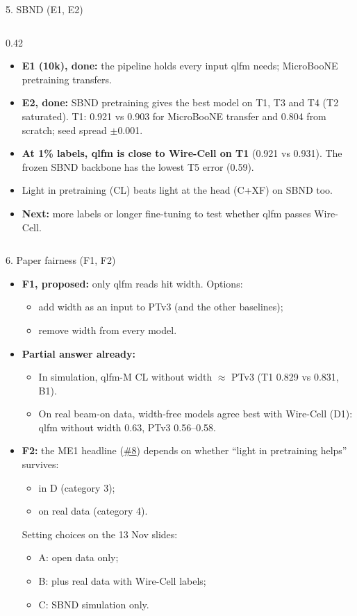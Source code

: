 \documentclass[aspectratio=169,10pt]{beamer}
\newcommand{\gh}{https://github.com/HaiwangYu/fm4npp-lartpc}
\newcommand{\iss}[1]{\href{\gh/issues/#1}{\color{blue!60!black}\##1}}
\begin{document}
\begin{frame}{5. SBND (E1, E2)}
\begin{columns}[T]
\begin{column}{0.42\textwidth}
\begin{itemize}
        \item \textbf{E1 (10k), done:} the pipeline holds every input qlfm needs; MicroBooNE pretraining transfers.
        \item \textbf{E2, done:} SBND pretraining gives the best model on T1, T3 and T4 (T2 saturated). T1: 0.921 vs 0.903 for MicroBooNE transfer and 0.804 from scratch; seed spread $\pm$0.001.
        \item \textbf{At 1\% labels, qlfm is close to Wire-Cell on T1} (0.921 vs 0.931). The frozen SBND backbone has the lowest T5 error (0.59).
        \item Light in pretraining (CL) beats light at the head (C+XF) on SBND too.
        \item \textbf{Next:} more labels or longer fine-tuning to test whether qlfm passes Wire-Cell.
      \end{itemize}
    \end{column}
  \end{columns}
\end{frame}

\begin{frame}{6. Paper fairness (F1, F2)}
  \footnotesize
  \begin{itemize}\setlength{\itemsep}{6pt}
    \item \textbf{F1, proposed:} only qlfm reads hit width. Options:
      \begin{itemize}
        \item add width as an input to PTv3 (and the other baselines);
        \item remove width from every model.
      \end{itemize}
    \item \textbf{Partial answer already:}
      \begin{itemize}
        \item In simulation, qlfm-M CL without width $\approx$ PTv3 (T1 0.829 vs 0.831, B1).
        \item On real beam-on data, width-free models agree best with Wire-Cell (D1): qlfm without width 0.63, PTv3 0.56--0.58.
      \end{itemize}
    \item \textbf{F2:} the ME1 headline (\iss{8}) depends on whether ``light in pretraining helps'' survives:
      \begin{itemize}
        \item in D (category 3);
        \item on real data (category 4).
      \end{itemize}
      Setting choices on the 13 Nov slides:
      \begin{itemize}
        \item A: open data only;
        \item B: plus real data with Wire-Cell labels;
        \item C: SBND simulation only.
      \end{itemize}
  \end{itemize}
\end{frame}
\end{document}
